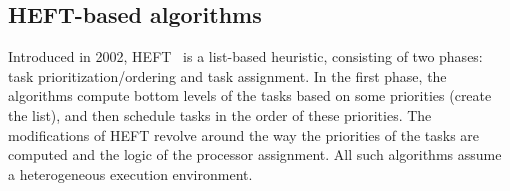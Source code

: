 \documentclass[conference]{IEEEtran}
\newcommand{\hmey}[1]{{\color{red}[HM: #1]}}
\begin{document}
\subsection{HEFT-based algorithms}
%
Introduced in 2002, HEFT~\cite{topcuoglu2002performance} is a list-based heuristic, consisting 
of two phases: task prio\-ri\-tization/ordering and task assignment.
In the first phase, the algorithms compute bottom levels of the tasks based on some priorities (create the list),
and then schedule tasks in the order of these priorities.
The modifications of HEFT revolve around the way the priorities of the tasks are computed and the logic of the processor assignment.
All such algorithms assume a heterogeneous execution environment.


\end{document}
